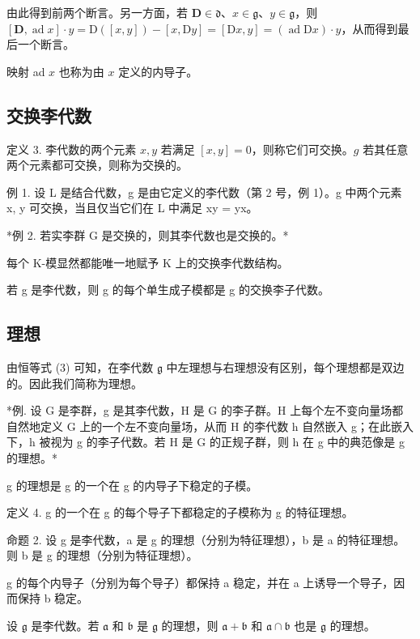 由此得到前两个断言。另一方面，若 \(\mathbf{D} \in \mathfrak{d}\)、\(x \in \mathfrak{g}\)、\(y \in \mathfrak{g}\)，则 \([\mathbf{D}, \operatorname{ad} x] \cdot y = \mathrm{D}([x, y]) - [x, \mathrm{D}y] = [\mathrm{D}x, y] = (\operatorname{ad} \mathrm{D}x) \cdot y\)，从而得到最后一个断言。

映射 ad \(x\) 也称为由 \(x\) 定义的内导子。

\subsection{交换李代数}

定义 3. 李代数的两个元素 \(x, y\) 若满足 \([x, y] = 0\)，则称它们可交换。\(g\) 若其任意两个元素都可交换，则称为交换的。

例 1. 设 L 是结合代数，g 是由它定义的李代数（第 2 号，例 1）。g 中两个元素 x, y 可交换，当且仅当它们在 L 中满足 xy = yx。

*例 2. 若实李群 G 是交换的，则其李代数也是交换的。*

每个 K-模显然都能唯一地赋予 K 上的交换李代数结构。

若 g 是李代数，则 g 的每个单生成子模都是 g 的交换李子代数。

\subsection{理想}

由恒等式 (3) 可知，在李代数 \(\mathfrak{g}\) 中左理想与右理想没有区别，每个理想都是双边的。因此我们简称为理想。

*例. 设 G 是李群，g 是其李代数，H 是 G 的李子群。H 上每个左不变向量场都自然地定义 G 上的一个左不变向量场，从而 H 的李代数 h 自然嵌入 g；在此嵌入下，h 被视为 g 的李子代数。若 H 是 G 的正规子群，则 h 在 g 中的典范像是 g 的理想。*

g 的理想是 g 的一个在 g 的内导子下稳定的子模。

定义 4. g 的一个在 g 的每个导子下都稳定的子模称为 g 的特征理想。

命题 2. 设 g 是李代数，a 是 g 的理想（分别为特征理想），b 是 a 的特征理想。则 b 是 g 的理想（分别为特征理想）。

g 的每个内导子（分别为每个导子）都保持 a 稳定，并在 a 上诱导一个导子，因而保持 b 稳定。

设 \(\mathfrak{g}\) 是李代数。若 \(\mathfrak{a}\) 和 \(\mathfrak{b}\) 是 \(\mathfrak{g}\) 的理想，则 \(\mathfrak{a} + \mathfrak{b}\) 和 \(\mathfrak{a} \cap \mathfrak{b}\) 也是 \(\mathfrak{g}\) 的理想。

